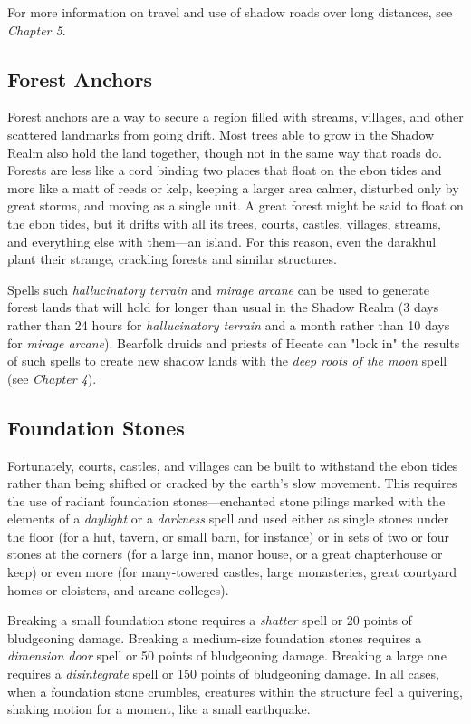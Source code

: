 \documentclass[10pt,a4paper,twoside,bg=print,twocolumn,openany,nodeprecatedcode]{dndbook}
\begin{document}
For more information on travel and use of shadow roads over long distances, see \textit{Chapter 5}.

\subsection{Forest Anchors}
Forest anchors are a way to secure a region filled with streams, villages, and other scattered landmarks from going drift. Most trees able to grow in the Shadow Realm also hold the land together, though not in the same way that roads do. Forests are less like a cord binding two places that float on the ebon tides and more like a matt of reeds or kelp, keeping a larger area calmer, disturbed only by great storms, and moving as a single unit. A great forest might be said to float on the ebon tides, but it drifts with all its trees, courts, castles, villages, streams, and everything else with them—an island. For this reason, even the darakhul plant their strange, crackling forests and similar structures.

Spells such \textit{hallucinatory terrain} and \textit{mirage arcane} can be used to generate forest lands that will hold for longer than usual in the Shadow Realm (3 days rather than 24 hours for \textit{hallucinatory terrain} and a month rather than 10 days for \textit{mirage arcane}). Bearfolk druids and priests of Hecate can "lock in" the results of such spells to create new shadow lands with the \textit{deep roots of the moon} spell (see \textit{Chapter 4}).

\subsection{Foundation Stones}
Fortunately, courts, castles, and villages can be built to withstand the ebon tides rather than being shifted or cracked by the earth's slow movement. This requires the use of radiant foundation stones—enchanted stone pilings marked with the elements of a \textit{daylight} or a \textit{darkness} spell and used either as single stones under the floor (for a hut, tavern, or small barn, for instance) or in sets of two or four stones at the corners (for a large inn, manor house, or a great chapterhouse or keep) or even more (for many-towered castles, large monasteries, great courtyard homes or cloisters, and arcane colleges).

Breaking a small foundation stone requires a \textit{shatter} spell or 20 points of bludgeoning damage. Breaking a medium-size foundation stones requires a \textit{dimension door} spell or 50 points of bludgeoning damage. Breaking a large one requires a \textit{disintegrate} spell or 150 points of bludgeoning damage. In all cases, when a foundation stone crumbles, creatures within the structure feel a quivering, shaking motion for a moment, like a small earthquake.
\end{document}
